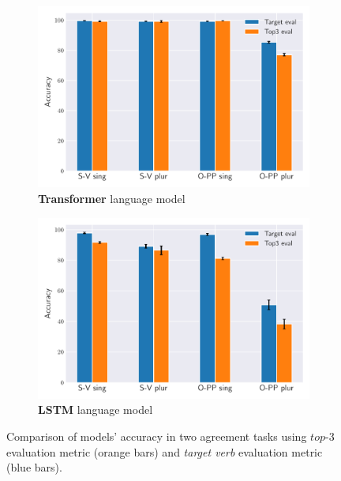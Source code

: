 \begin{figure}[ht]
    \centering
    \begin{subfigure}[b]{0.49\textwidth}
        \includegraphics[width=\textwidth]{figures/tm_2_eval.pdf}
        \caption{ \textbf{Transformer} language model}
        \label{fig:tm_2_eval}
    \end{subfigure}
    \hfill
    \begin{subfigure}[b]{0.49\textwidth}
        \includegraphics[width=\textwidth]{figures/lstm_2_eval.pdf}
        \caption{ \textbf{LSTM} language model
        }
        \label{fig:lstm_2_eval}
    \end{subfigure}
    \caption{Comparison of models' accuracy in two agreement tasks using $top$-3 evaluation metric (orange bars) and \textit{target verb} evaluation metric (blue bars).}
\end{figure}


